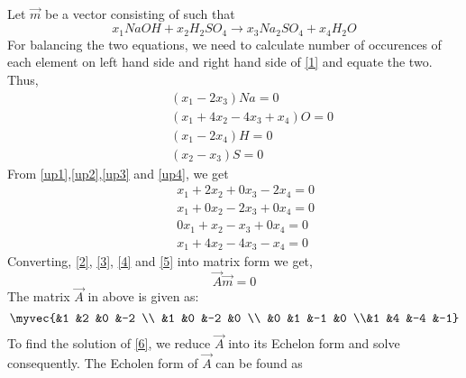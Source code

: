 Let $\vec{m}$ be a vector consisting of  such that
\begin{equation}\label{eq:solutions/chem/6b1}
 x_1NaOH + x_2H_2SO_4 \xrightarrow{} x_3Na_2SO_4  +  x_4H_2O
\end{equation}
For balancing the two equations, we need to calculate number of occurences of each element on left hand side and right hand side of \ref{1} and equate the two. Thus,
\begin{align}
 & \qquad (x_1 - 2x_3)Na = 0 \label{eq:solutions/chem/6bup1} \\ 
 & \qquad (x_1+4x_2-4x_3+x_4)O = 0 \label{eq:solutions/chem/6bup2}  \\ 
 & \qquad (x_1-2x_4)H = 0  \label{eq:solutions/chem/6bup3} \\ 
 & \qquad (x_2-x_3)S = 0 \label{eq:solutions/chem/6bup4}
\end{align}
From \ref{up1},\ref{up2},\ref{up3} and \ref{up4}, we get
\begin{align}	
 \quad & x_1  +  2x_2  +  0x_3 - 2x_4 =   0 \label{eq:solutions/chem/6b2} \\
 \quad & x_1  +  0x_2  - 2x_3 + 0x_4  =  0 \label{eq:solutions/chem/6b3} \\
 \quad & 0x_1   + x_2 - x_3 + 0x_4   = 0 \label{eq:solutions/chem/6b4} \\
 \quad & x_1 +  4x_2 - 4x_3 - x_4  = 0 \label{eq:solutions/chem/6b5}
\end{align}
Converting, \ref{2}, \ref{3}, \ref{4} and \ref{5} into matrix form we get,
\begin{equation}\label{eq:solutions/chem/6b6}
	\vec{A}\vec{m} = 0
\end{equation}
The matrix $\vec{A}$ in above is given as:
\begin{equation}
	\myvec{&1 &2 &0 &-2 \\ &1 &0 &-2 &0 \\ &0 &1 &-1 &0 \\&1 &4 &-4 &-1}
\end{equation}
To find the solution of \ref{6}, we reduce $\vec{A}$ into its Echelon form and solve consequently. The Echolen form of $\vec{A}$ can be found as
